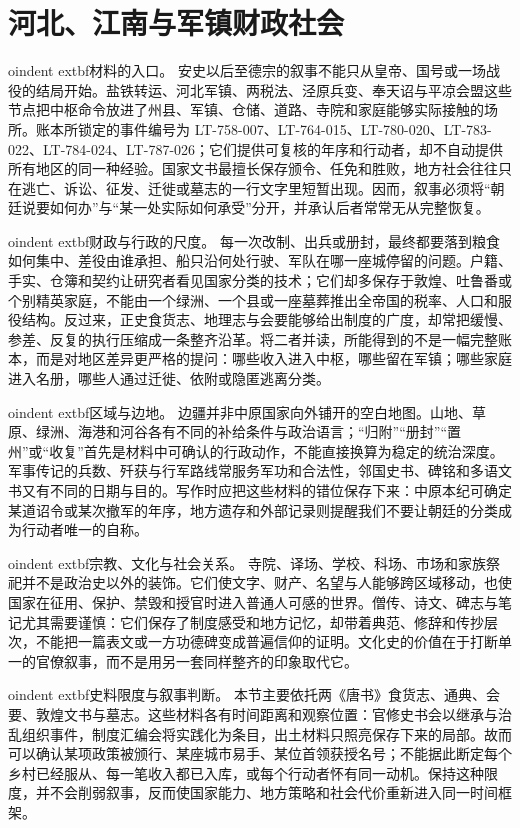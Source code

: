\section{河北、江南与军镇财政社会}
\label{sec:hebei-jiangnan-fiscal-society}

oindent	extbf{材料的入口。} 安史以后至德宗的叙事不能只从皇帝、国号或一场战役的结局开始。盐铁转运、河北军镇、两税法、泾原兵变、奉天诏与平凉会盟这些节点把中枢命令放进了州县、军镇、仓储、道路、寺院和家庭能够实际接触的场所。账本所锁定的事件编号为 LT-758-007、LT-764-015、LT-780-020、LT-783-022、LT-784-024、LT-787-026；它们提供可复核的年序和行动者，却不自动提供所有地区的同一种经验。国家文书最擅长保存颁令、任免和胜败，地方社会往往只在逃亡、诉讼、征发、迁徙或墓志的一行文字里短暂出现。因而，叙事必须将“朝廷说要如何办”与“某一处实际如何承受”分开，并承认后者常常无从完整恢复。


oindent	extbf{财政与行政的尺度。} 每一次改制、出兵或册封，最终都要落到粮食如何集中、差役由谁承担、船只沿何处行驶、军队在哪一座城停留的问题。户籍、手实、仓簿和契约让研究者看见国家分类的技术；它们却多保存于敦煌、吐鲁番或个别精英家庭，不能由一个绿洲、一个县或一座墓葬推出全帝国的税率、人口和服役结构。反过来，正史食货志、地理志与会要能够给出制度的广度，却常把缓慢、参差、反复的执行压缩成一条整齐沿革。将二者并读，所能得到的不是一幅完整账本，而是对地区差异更严格的提问：哪些收入进入中枢，哪些留在军镇；哪些家庭进入名册，哪些人通过迁徙、依附或隐匿逃离分类。


oindent	extbf{区域与边地。} 边疆并非中原国家向外铺开的空白地图。山地、草原、绿洲、海港和河谷各有不同的补给条件与政治语言；“归附”“册封”“置州”或“收复”首先是材料中可确认的行政动作，不能直接换算为稳定的统治深度。军事传记的兵数、歼获与行军路线常服务军功和合法性，邻国史书、碑铭和多语文书又有不同的日期与目的。写作时应把这些材料的错位保存下来：中原本纪可确定某道诏令或某次撤军的年序，地方遗存和外部记录则提醒我们不要让朝廷的分类成为行动者唯一的自称。


oindent	extbf{宗教、文化与社会关系。} 寺院、译场、学校、科场、市场和家族祭祀并不是政治史以外的装饰。它们使文字、财产、名望与人能够跨区域移动，也使国家在征用、保护、禁毁和授官时进入普通人可感的世界。僧传、诗文、碑志与笔记尤其需要谨慎：它们保存了制度感受和地方记忆，却带着典范、修辞和传抄层次，不能把一篇表文或一方功德碑变成普遍信仰的证明。文化史的价值在于打断单一的官僚叙事，而不是用另一套同样整齐的印象取代它。


oindent	extbf{史料限度与叙事判断。} 本节主要依托两《唐书》食货志、通典、会要、敦煌文书与墓志。这些材料各有时间距离和观察位置：官修史书会以继承与治乱组织事件，制度汇编会将实践化为条目，出土材料只照亮保存下来的局部。故而可以确认某项政策被颁行、某座城市易手、某位首领获授名号；不能据此断定每个乡村已经服从、每一笔收入都已入库，或每个行动者怀有同一动机。保持这种限度，并不会削弱叙事，反而使国家能力、地方策略和社会代价重新进入同一时间框架。

